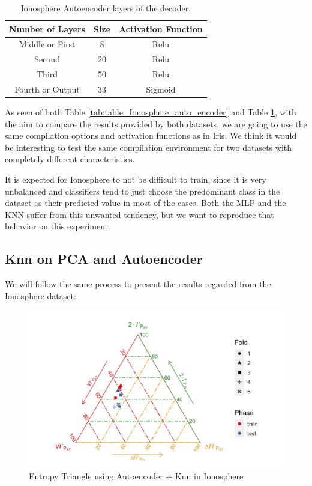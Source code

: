 \begin{table}[H]
	\caption{Ionosphere Autoencoder layers of the decoder.}
	\begin{center}
		\label{tab:table_Ionosphere_auto_decoder}
		\begin{tabular}{c|c|c} %
			\textbf{Number of Layers} & \textbf{Size} & \textbf{Activation Function} \\
			\hline
			Middle or First & 8 & Relu\\
			Second & 20 & Relu\\
			Third & 50 & Relu\\
			Fourth or Output & 33 & Sigmoid\\
		\end{tabular}
	\end{center}
\end{table}

As seen of both Table \ref{tab:table_Ionosphere_auto_encoder} and Table \ref{tab:table_Ionosphere_auto_decoder}, with the aim to compare the results provided by both datasets, we are going to use the same compilation options and activation functions as in Iris. We think it would be interesting to test the same compilation environment for two datasets with completely different characteristics.\par

It is expected for Ionosphere to not be difficult to train, since it is very unbalanced and classifiers tend to just choose the predominant class in the dataset as their predicted value in most of the cases. Both the MLP and the KNN suffer from this unwanted tendency, but we want to reproduce that behavior on this experiment.

\subsection{Knn on PCA and Autoencoder}

We will follow the same process to present the results regarded from the Ionosphere dataset:

\begin{figure}[H]
	\centering
	\includegraphics[width=\linewidth]{Figuras_tfg/ET_Iono_Auto_Knn}
	\caption{Entropy Triangle using Autoencoder + Knn in Ionosphere}
	\label{fig:figure_Knn_Iono_ET_Auto}
\end{figure}

